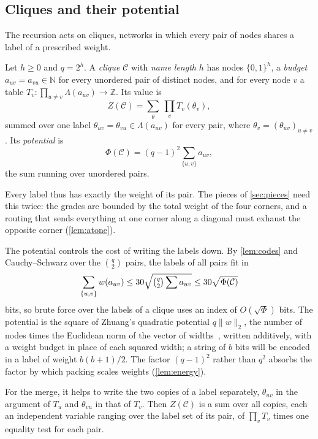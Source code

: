 \documentclass[11pt]{article}
\theoremstyle{definition}
\theoremstyle{definition}
\theoremstyle{remark}
\newcommand{\Z}{\mathbb{Z}}
\newcommand{\N}{\mathbb{N}}
\newcommand{\norm}[1]{\lVert #1\rVert}
\begin{document}
\subsection{Cliques and their potential}\label{sec:cliques}

The recursion acts on cliques, networks in which every pair of nodes shares a label of a prescribed weight.

\begin{definition}\label{def:clique}
Let $h\ge0$ and $q=2^h$. A \emph{clique} $\mathcal C$ with \emph{name length} $h$ has nodes $\{0,1\}^h$, a \emph{budget} $a_{uv}=a_{vu}\in\N$ for every unordered pair of distinct nodes, and for every node $v$ a table $T_v\colon\prod_{u\ne v}\Lambda(a_{uv})\to\Z$. Its value is
\[
Z(\mathcal C)=\sum_\theta\ \prod_vT_v(\theta_v),
\]
summed over one label $\theta_{uv}=\theta_{vu}\in\Lambda(a_{uv})$ for every pair, where $\theta_v=(\theta_{uv})_{u\ne v}$. Its \emph{potential} is
\[
\Phi(\mathcal C)=(q-1)^2\sum_{\{u,v\}}a_{uv},
\]
the sum running over unordered pairs.
\end{definition}

Every label thus has exactly the weight of its pair. The pieces of \cref{sec:pieces} need this twice: the grades are bounded by the total weight of the four corners, and a routing that sends everything at one corner along a diagonal must exhaust the opposite corner (\cref{lem:atone}).

The potential controls the cost of writing the labels down. By \cref{lem:codes} and Cauchy--Schwarz over the $\binom q2$ pairs, the labels of all pairs fit in
\[
\sum_{\{u,v\}}w(a_{uv})\le30\sqrt{\tbinom q2\sum a_{uv}}\le30\sqrt{\Phi(\mathcal C)}
\]
bits, so brute force over the labels of a clique uses an index of $O(\sqrt\Phi)$ bits. The potential is the square of Zhuang's quadratic potential $q\norm w_2$, the number of nodes times the Euclidean norm of the vector of widths~\cite{Zhu26}, written additively, with a weight budget in place of each squared width; a string of $b$ bits will be encoded in a label of weight $b(b+1)/2$. The factor $(q-1)^2$ rather than $q^2$ absorbs the factor by which packing scales weights (\cref{lem:energy}).

For the merge, it helps to write the two copies of a label separately, $\theta_{uv}$ in the argument of $T_u$ and $\theta_{vu}$ in that of $T_v$. Then $Z(\mathcal C)$ is a sum over all copies, each an independent variable ranging over the label set of its pair, of $\prod_vT_v$ times one equality test for each pair.
\end{document}
